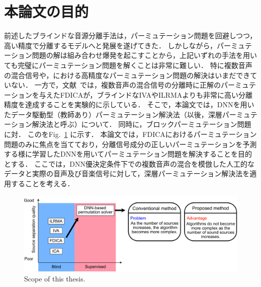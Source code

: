 \section{本論文の目的}
前述したブラインドな音源分離手法は，パーミュテーション問題を回避しつつ，高い精度で分離するモデルへと発展を遂げてきた．
しかしながら，パーミュテーション問題の解は組み合わせ爆発を起こすことから，上記いずれの手法を用いても完璧にパーミュテーション問題を解くことは非常に難しい．
特に複数音声の混合信号や，における高精度なパーミュテーション問題の解決はいまだできていない．
一方で，文献~\cite{EU}では，複数音声の混合信号の分離時に正解のパーミュテーションを与えたFDICAが，ブラインドなIVAやILRMAよりも非常に高い分離精度を達成することを実験的に示している．
そこで，本論文では，DNNを用いたデータ駆動型（教師あり）パーミュテーション解決法（以後，深層パーミュテーション解決法と呼ぶ）について．
同時に，ブロックパーミュテーション問題に対．
このをFig.~\ref{fig:scope} に示す．
本論文では，FDICAにおけるパーミュテーション問題のみに焦点を当てており，分離信号成分の正しいパーミュテーションを予測する様に学習したDNNを用いてパーミュテーション問題を解決することを目的とする．
ここでは，DNN優決定条件下での複数音声の混合を模倣した人工的なデータと実際の音声及び音楽信号に対して，深層パーミュテーション解決法を適用することを考える．

\begin{figure}[t]
    \vspace{4pt}
    \begin{center}
        \includegraphics[width=1.0\columnwidth]{figures/chapter1/scope.pdf}
    \end{center}
    \vspace{-8pt}
	\caption{Scope of this thesis.}
	\label{fig:scope}
\end{figure}


